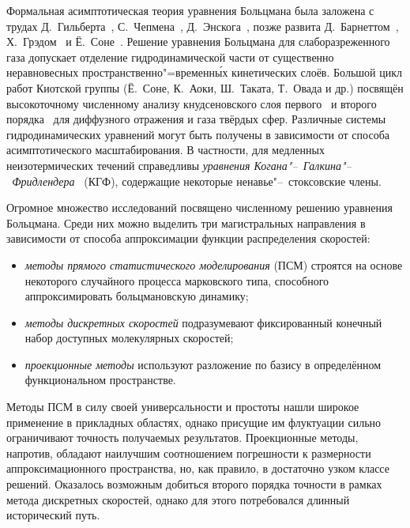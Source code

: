 {\progress}

Формальная асимптотическая теория уравнения Больцмана была заложена с трудах Д.~Гильберта~\autocite{Hilbert1912},
С.~Чепмена~\autocite{Chapman1916}, Д.~Энскога~\autocite{Enskog1917},
позже развита Д.~Барнеттом~\autocite{Burnett1935}, Х.~Грэдом~\autocite{Grad1963a} и Ё.~Соне~\autocite{Sone2002}.
Решение уравнения Больцмана для слаборазреженного газа допускает отделение гидродинамической части
от существенно неравновесных пространственно"=временн\'{ы}х кинетических слоёв.
Большой цикл работ Киотской группы (Ё.~Соне, К.~Аоки, Ш.~Таката, Т.~Овада и др.)
посвящён высокоточному численному анализу кнудсеновского слоя первого~\autocite{Ohwada1989creep, Ohwada1989jump}
и второго порядка~\autocite{Ohwada1992, Takata2015second, Takata2015curvature}
для диффузного отражения и газа твёрдых сфер.
Различные системы гидродинамических уравнений могут быть получены в зависимости от способа асимптотического масштабирования.
В частности, для медленных неизотермических течений справедливы
\emph{уравнения Когана"--~Галкина"--~Фридлендера}~\autocite{Kogan1976} (КГФ),
содержащие некоторые ненавье"--~стоксовские члены.

Огромное множество исследований посвящено численному решению уравнения Больцмана.
Среди них можно выделить три магистральных направления в зависимости от способа аппроксимации
функции распределения скоростей:
\begin{itemize}
    \item \emph{методы прямого статистического моделирования} (ПСМ)
    строятся на основе некоторого случайного процесса марковского типа,
    способного аппроксимировать больцмановскую динамику;
    \item \emph{методы дискретных скоростей} подразумевают фиксированный конечный набор доступных молекулярных скоростей;
    \item \emph{проекционные методы} используют разложение по базису в определённом функциональном пространстве.
\end{itemize}
Методы ПСМ в силу своей универсальности и простоты нашли широкое применение в прикладных областях,
однако присущие им флуктуации сильно ограничивают точность получаемых результатов.
Проекционные методы, напротив, обладают наилучшим соотношением погрешности к размерности аппроксимационного пространства,
но, как правило, в достаточно узком классе решений.
Оказалось возможным добиться второго порядка точности в рамках метода дискретных скоростей,
однако для этого потребовался длинный исторический путь.

